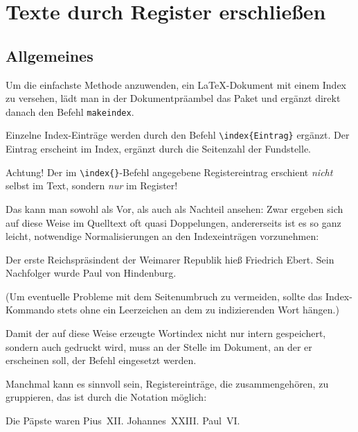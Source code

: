 \chapter{Texte durch Register erschließen}
 

\section{Allgemeines}

Um die einfachste Methode anzuwenden, ein \LaTeX{}-Dokument mit einem Index zu versehen, lädt man
in der Dokumentpräambel das Paket  und ergänzt direkt danach den Befehl 
\lstinline/makeindex/.

Einzelne Index-Einträge werden durch den Befehl \lstinline/\index{Eintrag}/ ergänzt. 
Der Eintrag erscheint im Index, ergänzt durch die Seitenzahl der Fundstelle.

Achtung! Der im \lstinline/\index{}/-Befehl angegebene Registereintrag erschient \emph{nicht} selbst
im Text, sondern \emph{nur} im Register!

Das kann man sowohl als Vor, als auch als Nachteil ansehen:
Zwar ergeben sich auf diese Weise im Quelltext oft quasi Doppelungen, andererseits ist es so ganz 
leicht, notwendige Normalisierungen an den Indexeinträgen vorzunehmen:

\begin{lfgwcode}{}
    Der erste Reichspräsindent der Weimarer Republik hieß Friedrich Ebert.
    Sein Nachfolger wurde Paul von Hindenburg.
\end{lfgwcode}

(Um eventuelle Probleme mit dem Seitenumbruch zu vermeiden, sollte das Index-Kommando stets ohne
ein Leerzeichen an dem zu indizierenden Wort hängen.)

Damit der auf diese Weise erzeugte Wortindex nicht nur intern gespeichert, sondern auch gedruckt
wird, muss an der Stelle im Dokument, an der er erscheinen soll, der Befehl 
eingesetzt werden. 


Manchmal kann es sinnvoll sein, Registereinträge, die zusammengehören, zu gruppieren,
das ist durch die Notation  möglich:
    
\begin{lfgwcode}{}
    Die Päpste waren 
    Pius~XII.
    Johannes~XXIII.
    Paul~VI.
\end{lfgwcode}    


